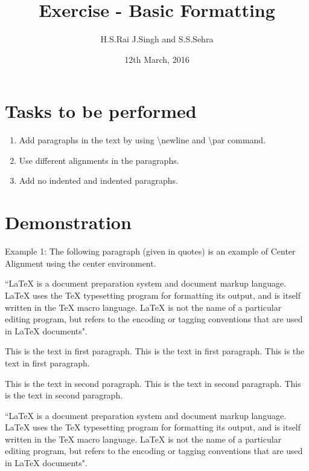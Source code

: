 \documentclass{article}
\title{Exercise - Basic Formatting}
\author{H.S.Rai J.Singh and S.S.Sehra}
\date{12th March, 2016}
\begin{document}
\maketitle
\section*{Tasks to be performed}

\begin{enumerate}
\item Add paragraphs in the text by using  \textbackslash newline and \textbackslash par command.

\item Use different alignments in  the paragraphs.

\item  Add no indented and indented paragraphs.
\end{enumerate}



\section*{Demonstration}
\begin{center}
Example 1: The following paragraph (given in quotes) is an example of Center Alignment using the center environment. 

``LaTeX is a document preparation system and document markup language. LaTeX uses the TeX typesetting program for formatting its output, and is itself written in the TeX macro language. LaTeX is not the name of a particular editing program, but refers to the encoding or tagging conventions that are used in LaTeX documents".
\end{center}

\setlength{\parindent}{10ex}

This is the text in first paragraph. This is the text in first 
paragraph. This is the text in first paragraph. \par
\noindent %
This is the text in second paragraph. This is the text in second 
paragraph. This is the text in second paragraph.


\begin{flushleft}
``LaTeX is a document preparation system and document markup language. LaTeX uses the TeX typesetting program for formatting its output, and is itself written in the TeX macro language. LaTeX is not the name of a particular editing program, but refers to the encoding or tagging conventions that are used in LaTeX documents".
\end{flushleft}
\end{document}
